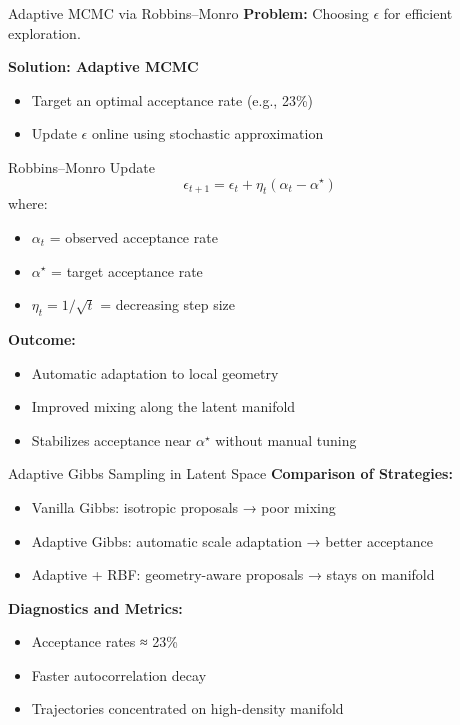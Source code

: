 \documentclass[aspectratio=169, 10pt]{beamer}
\begin{document}
\begin{frame}{Adaptive MCMC via Robbins--Monro}
  \textbf{Problem:} Choosing $\epsilon$ for efficient exploration.

  \textbf{Solution: Adaptive MCMC}
  \begin{itemize}
      \item Target an optimal acceptance rate (e.g., 23\%)
      \item Update $\epsilon$ online using stochastic approximation
  \end{itemize}

  \begin{block}{Robbins--Monro Update}
    $$
    \epsilon_{t+1} = \epsilon_t +
    \eta_t \left( \alpha_t - \alpha^\star \right)
    $$
    where:
    \begin{itemize}
        \item $\alpha_t$ = observed acceptance rate
        \item $\alpha^\star$ = target acceptance rate
        \item $\eta_t = 1/\sqrt{t}$ = decreasing step size
    \end{itemize}
  \end{block}

  \textbf{Outcome:}
  \begin{itemize}
      \item Automatic adaptation to local geometry
      \item Improved mixing along the latent manifold
      \item Stabilizes acceptance near $\alpha^\star$ without manual tuning
  \end{itemize}
\end{frame}


\begin{frame}{Adaptive Gibbs Sampling in Latent Space}
  \textbf{Comparison of Strategies:}
  \begin{itemize}
      \item Vanilla Gibbs: isotropic proposals → poor mixing
      \item Adaptive Gibbs: automatic scale adaptation → better acceptance
      \item Adaptive + RBF: geometry-aware proposals → stays on manifold
  \end{itemize}

  \vspace{0.3cm}
  \textbf{Diagnostics and Metrics:}
  \begin{itemize}
      \item Acceptance rates ≈ 23\%
      \item Faster autocorrelation decay
      \item Trajectories concentrated on high-density manifold
  \end{itemize}
\end{frame}
\end{document}
